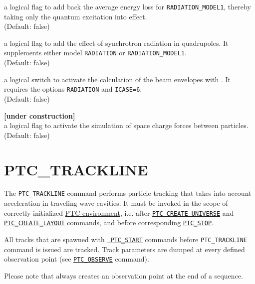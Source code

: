 \begin{madlist}
    a logical flag to add back the
   average energy loss for {\tt RADIATION\_MODEL1}, thereby taking only
   the quantum excitation into effect.\\ (Default: false)

    a logical flag to add the effect of
   synchrotron radiation in quadrupoles. It supplements either model
   {\tt RADIATION} or {\tt RADIATION\_MODEL1}. \\
   (Default: false)

    a logical switch to activate the calculation
   of the beam envelopes with \ptc. It requires the options
   {\tt RADIATION} and {\tt ICASE=6}.\\
   (Default: false)

    {\bf [under construction]}\\
     a logical flag to activate the simulation of space charge forces
     between particles. \\ (Default: false)  
\end{madlist}


\section{PTC\_TRACKLINE}
\label{sec:ptc_trackline}

The {\tt PTC\_TRACKLINE} command performs particle tracking that takes
into account acceleration in traveling wave cavities. 
It must be invoked in the scope of correctly initialized
\hyperref[chap:ptc_general]{PTC environment}, 
i.e. after \hyperref[sec:ptc_create_universe]{\tt PTC\_CREATE\_UNIVERSE}
and \hyperref[sec:ptc_create_layout]{\tt PTC\_CREATE\_LAYOUT} commands, and before
corresponding \hyperref[sec:ptc_stop]{\tt PTC\_STOP}. 

All tracks that are spawned with \hyperref[sec:ptc_start]{\tt
  PTC\_START} commands before {\tt PTC\_TRACKLINE} command is issued are
tracked. Track parameters are dumped at every defined observation point
(see \hyperref[sec:ptc_observe]{\tt PTC\_OBSERVE} command). 

Please note that \madx always creates an observation point at the end of a
sequence.


